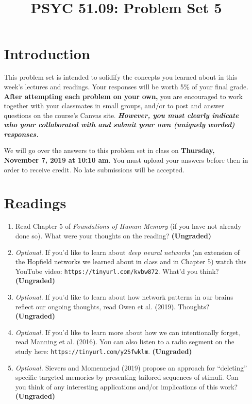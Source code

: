 \documentclass[11pt]{article}
\title{PSYC 51.09: Problem Set 5}
\date{}
\begin{document}
\maketitle
\vspace{-0.75in}
\section*{Introduction}
This problem set is intended to solidify the concepts you learned
about in this week's lectures and readings.  Your responses will be
worth 5\% of your final grade.  \textbf{After attempting each problem
  on your own,} you are encouraged to work together with your classmates in small groups, and/or to post and answer questions on the course’s Canvas site.  \textbf{\textit{However, you must clearly indicate who your collaborated with and submit your own (uniquely worded) responses.}}

We will go over the answers to this problem set in class on \textbf{Thursday, November 7, 2019 at 10:10 am}.  You must upload your answers before then in order to receive credit.  No late submissions will be accepted.

\section*{Readings}
\begin{enumerate}
\item Read Chapter 5 of \textit{Foundations of Human Memory} (if you
  have not already done so).  What were your thoughts on the reading?
  \textbf{(Ungraded)}

\item \textit{Optional.}  If you'd like to learn about \textit{deep neural networks} (an
  extension of the Hopfield networks we learned about in class and in
  Chapter 5) watch this YouTube video:
  \texttt{https://tinyurl.com/kvbw872}.  What'd you think?
  \textbf{(Ungraded)}

\item \textit{Optional.} If you'd like to learn about how network
  patterns in our brains reflect our ongoing thoughts, read Owen et
  al. (2019).  Thoughts?  \textbf{(Ungraded)}

\item \textit{Optional.} If you'd like to learn more about how we can
  intentionally forget, read Manning et al. (2016).  You can also
  listen to a radio segment on the study here:
  \texttt{https://tinyurl.com/y25fwklm}. \textbf{(Ungraded)}

  \item \textit{Optional.} Sievers and Momennejad (2019) propose an
    approach for ``deleting'' specific targeted  memories by
    presenting tailored sequences of stimuli.  Can you think of any
    interesting applications and/or implications of this work?  \textbf{(Ungraded)}
\end{enumerate}
\end{document}
